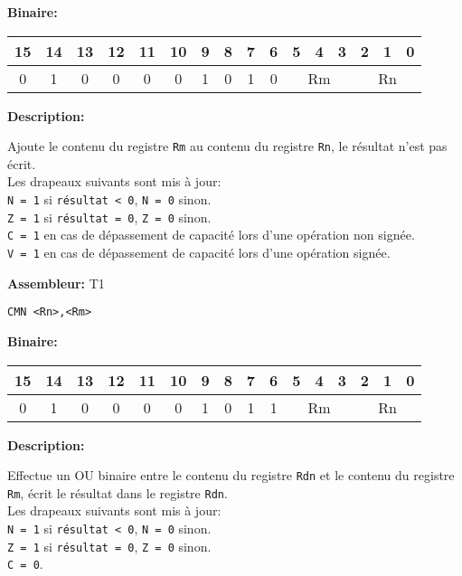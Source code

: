 \documentclass{article}
\begin{document}
    \textbf{Binaire:}

    \begin{tabular}{| c c c c c c c c c c c c c c c c |}
        \hline
        15 & 14 & 13 & 12 & 11 & 10 & \multicolumn{1}{|c}{9} & 8 & 7 & 6 & \multicolumn{1}{|c}{5} & 4 & 3 & \multicolumn{1}{|c}{2} & 1 & 0 \\
        \hline
        0 & 1 & 0 & 0 & 0 & 0 & \multicolumn{1}{|c}{1} & 0 & 1 & 0 & \multicolumn{3}{|c}{Rm} & \multicolumn{3}{|c|}{Rn} \\
        \hline
    \end{tabular}



    \textbf{Description: }

    Ajoute le contenu du registre \texttt{Rm} au contenu du registre \texttt{Rn}, le résultat n'est pas écrit.\\
    Les drapeaux suivants sont mis à jour:\\
    \texttt{N = 1} si \texttt{résultat < 0}, \texttt{N = 0} sinon.\\
    \texttt{Z = 1} si \texttt{résultat = 0}, \texttt{Z = 0} sinon.\\
    \texttt{C = 1} en cas de dépassement de capacité lors d'une opération non signée.\\
    \texttt{V = 1} en cas de dépassement de capacité lors d'une opération signée.

    \textbf{Assembleur:} T1

    \begin{lstlisting}
CMN <Rn>,<Rm>
    \end{lstlisting}

    \textbf{Binaire:}

    \begin{tabular}{| c c c c c c c c c c c c c c c c |}
        \hline
        15 & 14 & 13 & 12 & 11 & 10 & \multicolumn{1}{|c}{9} & 8 & 7 & 6 & \multicolumn{1}{|c}{5} & 4 & 3 & \multicolumn{1}{|c}{2} & 1 & 0 \\
        \hline
        0 & 1 & 0 & 0 & 0 & 0 & \multicolumn{1}{|c}{1} & 0 & 1 & 1 & \multicolumn{3}{|c}{Rm} & \multicolumn{3}{|c|}{Rn} \\
        \hline
    \end{tabular}



    \textbf{Description: }

    Effectue un OU binaire entre le contenu du registre \texttt{Rdn} et le contenu du registre \texttt{Rm}, écrit le résultat dans le registre \texttt{Rdn}.\\
    Les drapeaux suivants sont mis à jour:\\
    \texttt{N = 1} si \texttt{résultat < 0}, \texttt{N = 0} sinon.\\
    \texttt{Z = 1} si \texttt{résultat = 0}, \texttt{Z = 0} sinon.\\
    \texttt{C = 0}.
\end{document}
